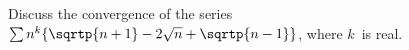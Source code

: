 Discuss the convergence of the series $\sum n^{k}\{\sqrtp{n + 1} - 2\sqrt{n} + \sqrtp{n - 1}\}$,
where $k$~is real. 

